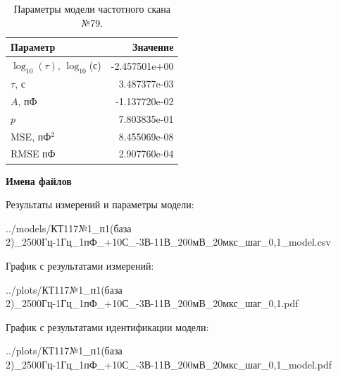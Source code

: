 \begin{table}[!ht]
    \centering
    \caption{Параметры модели частотного скана №79.}
    \begin{tabular}{|l|r|}
        \hline
        Параметр                                       & Значение                  \\ \hline
        $\log_{10}(\tau)$, $\log_{10}$(с)              & -2.457501e+00             \\ \hline
        $\tau$, с                                      & 3.487377e-03              \\ \hline
        $A$, пФ                                        & -1.137720e-02             \\ \hline
        $p$                                            & 7.803835e-01              \\ \hline
        MSE, пФ$^2$                                    & 8.455069e-08              \\ \hline
        RMSE пФ                                        & 2.907760e-04              \\ \hline
    \end{tabular}
    \label{table:frequency_scan_model_79}
\end{table}

\textbf{Имена файлов}

Результаты измерений и параметры модели:

\scriptsize../models/КТ117№1\_п1(база 2)\_2500Гц-1Гц\_1пФ\_+10С\_-3В-11В\_200мВ\_20мкс\_шаг\_0,1\_model.csv
\normalsize

График с результатами измерений:

\scriptsize../plots/КТ117№1\_п1(база 2)\_2500Гц-1Гц\_1пФ\_+10С\_-3В-11В\_200мВ\_20мкс\_шаг\_0,1.pdf
\normalsize

График с результатами идентификации модели:

\scriptsize../plots/КТ117№1\_п1(база 2)\_2500Гц-1Гц\_1пФ\_+10С\_-3В-11В\_200мВ\_20мкс\_шаг\_0,1\_model.pdf
\normalsize

